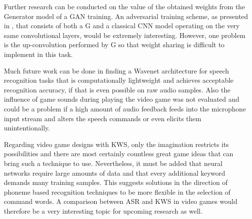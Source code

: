 Further research can be conducted on the value of the obtained weights from the Generator model of a GAN training. 
An adversarial training scheme, as presented in \cite{Oezdenizci2020}, that consists of both a G and a classical CNN model operating on the very same convolutional layers, would be extremely interesting. 
However, one problem is the up-convolution performed by G so that weight sharing is difficult to implement in this task.

Much future work can be done in finding a Wavenet architecture for speech recognition tasks that is computationally lightweight and achieves acceptable recognition accuracy, if that is even possible on raw audio samples.
Also the influence of game sounds during playing the video game was not evaluated and could be a problem if a high amount of audio feedback feeds into the microphone input stream and alters the speech commands or even elicits them unintentionally.

Regarding video game designs with KWS, only the imagination restricts its possibilities and there are most certainly countless great game ideas that can bring such a technique to use.
Nevertheless, it must be added that neural networks require large amounts of data and that every additional keyword demands many training samples.
This suggests solutions in the direction of phoneme based recognition techniques to be more flexible in the selection of command words.
A comparison between ASR and KWS in video games would therefore be a very interesting topic for upcoming research as well.